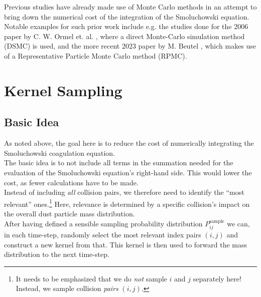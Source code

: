     Previous studies have already made use of Monte Carlo methods in an attempt to 
    bring down the numerical cost of the integration of the Smoluchowski equation. \\

    Notable examples for such prior work include e.g. the studies done for the 
    2006 paper by C. W. Ormel et. al. \cite{ormel_2006}, where a 
    direct Monte-Carlo simulation method (DSMC) is used, and 
    the more recent 2023 paper by M. Beutel \cite{beutel_2023},
    which makes use of a Representative Particle Monte Carlo method (RPMC). \\



\section{Kernel Sampling}

\subsection{Basic Idea}

    As noted above, the goal here is to reduce the cost of numerically integrating the 
    Smoluchowski coagulation equation. \\

    The basic idea is to not include all terms in the summation needed for the evaluation 
    of the Smoluchowski equation's right-hand side. This would lower the cost, as fewer 
    calculations have to be made. \\

    Instead of including \textit{all} collision pairs, we therefore need to identify the ``most 
    relevant'' ones.\footnote{
        It needs to be emphasized that we do \textit{not} sample $i$ and $j$ separately here! 
        Instead, we sample collision \textit{pairs} $(i, j)$.
    }
    Here, relevance is determined by a specific collision's impact on the overall 
    dust particle mass distribution. \\

    After having defined a sensible sampling probability distribution           
    $P_{ij}^\text{sample}$ we can, in each time-step, randomly select the most relevant 
    index pairs $(i, j)$ and construct a new kernel from that.
    This kernel is then used to forward the mass distribution to the next time-step. \\

